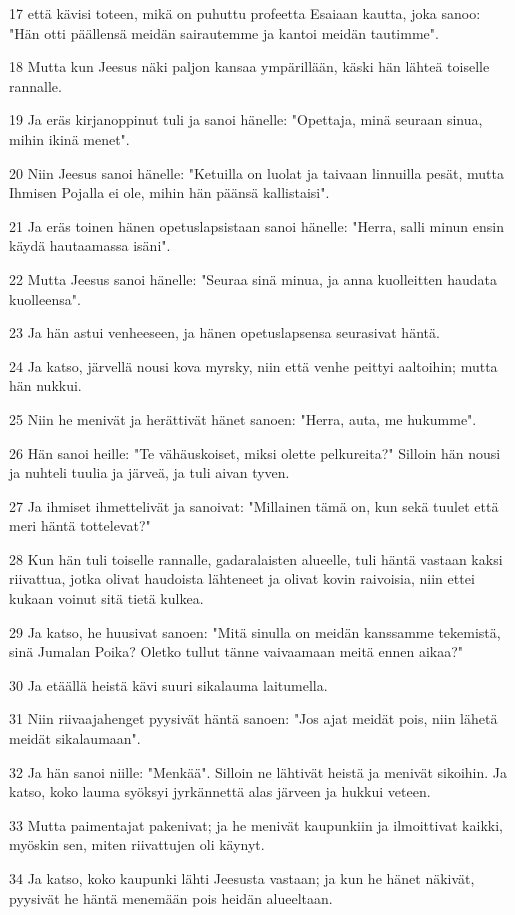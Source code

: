 \par 17 että kävisi toteen, mikä on puhuttu profeetta Esaiaan kautta, joka sanoo: "Hän otti päällensä meidän sairautemme ja kantoi meidän tautimme".
\par 18 Mutta kun Jeesus näki paljon kansaa ympärillään, käski hän lähteä toiselle rannalle.
\par 19 Ja eräs kirjanoppinut tuli ja sanoi hänelle: "Opettaja, minä seuraan sinua, mihin ikinä menet".
\par 20 Niin Jeesus sanoi hänelle: "Ketuilla on luolat ja taivaan linnuilla pesät, mutta Ihmisen Pojalla ei ole, mihin hän päänsä kallistaisi".
\par 21 Ja eräs toinen hänen opetuslapsistaan sanoi hänelle: "Herra, salli minun ensin käydä hautaamassa isäni".
\par 22 Mutta Jeesus sanoi hänelle: "Seuraa sinä minua, ja anna kuolleitten haudata kuolleensa".
\par 23 Ja hän astui venheeseen, ja hänen opetuslapsensa seurasivat häntä.
\par 24 Ja katso, järvellä nousi kova myrsky, niin että venhe peittyi aaltoihin; mutta hän nukkui.
\par 25 Niin he menivät ja herättivät hänet sanoen: "Herra, auta, me hukumme".
\par 26 Hän sanoi heille: "Te vähäuskoiset, miksi olette pelkureita?" Silloin hän nousi ja nuhteli tuulia ja järveä, ja tuli aivan tyven.
\par 27 Ja ihmiset ihmettelivät ja sanoivat: "Millainen tämä on, kun sekä tuulet että meri häntä tottelevat?"
\par 28 Kun hän tuli toiselle rannalle, gadaralaisten alueelle, tuli häntä vastaan kaksi riivattua, jotka olivat haudoista lähteneet ja olivat kovin raivoisia, niin ettei kukaan voinut sitä tietä kulkea.
\par 29 Ja katso, he huusivat sanoen: "Mitä sinulla on meidän kanssamme tekemistä, sinä Jumalan Poika? Oletko tullut tänne vaivaamaan meitä ennen aikaa?"
\par 30 Ja etäällä heistä kävi suuri sikalauma laitumella.
\par 31 Niin riivaajahenget pyysivät häntä sanoen: "Jos ajat meidät pois, niin lähetä meidät sikalaumaan".
\par 32 Ja hän sanoi niille: "Menkää". Silloin ne lähtivät heistä ja menivät sikoihin. Ja katso, koko lauma syöksyi jyrkännettä alas järveen ja hukkui veteen.
\par 33 Mutta paimentajat pakenivat; ja he menivät kaupunkiin ja ilmoittivat kaikki, myöskin sen, miten riivattujen oli käynyt.
\par 34 Ja katso, koko kaupunki lähti Jeesusta vastaan; ja kun he hänet näkivät, pyysivät he häntä menemään pois heidän alueeltaan.

